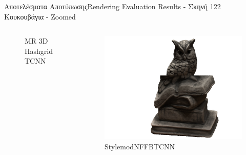 \documentclass[10pt]{beamer}
\begin{document}
\begin{frame}{Αποτελέσματα Αποτύπωσης}{Rendering Evaluation Results - Σκηνή 122 Κουκουβάγια - Zoomed}
\begin{columns}[T]
\begin{figure}
                \caption{\tiny{MR 3D Hashgrid TCNN}}
            \end{figure}
            \begin{figure}
                \includegraphics[height=.3\textheight, width=\linewidth, keepaspectratio]{images/chapter5_img/RenderingResults/StylemodNFFBTCNN/eval_055_zoomed.jpg}
                \caption{\tiny{StylemodNFFBTCNN}}
            \end{figure}
    \end{columns}
\end{frame}
\end{document}
